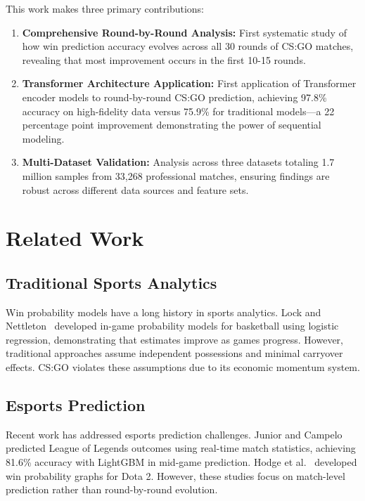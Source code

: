 \documentclass[10pt,twocolumn]{article}
\begin{document}
This work makes three primary contributions:

\begin{enumerate}
    \item \textbf{Comprehensive Round-by-Round Analysis:} First systematic study of how win prediction accuracy evolves across all 30 rounds of CS:GO matches, revealing that most improvement occurs in the first 10-15 rounds.

    \item \textbf{Transformer Architecture Application:} First application of Transformer encoder models to round-by-round CS:GO prediction, achieving 97.8\% accuracy on high-fidelity data versus 75.9\% for traditional models---a 22 percentage point improvement demonstrating the power of sequential modeling.

    \item \textbf{Multi-Dataset Validation:} Analysis across three datasets totaling 1.7 million samples from 33,268 professional matches, ensuring findings are robust across different data sources and feature sets.
\end{enumerate}

\section{Related Work}

\subsection{Traditional Sports Analytics}
Win probability models have a long history in sports analytics. Lock and Nettleton~\cite{lock2014} developed in-game probability models for basketball using logistic regression, demonstrating that estimates improve as games progress. However, traditional approaches assume independent possessions and minimal carryover effects. CS:GO violates these assumptions due to its economic momentum system.

\subsection{Esports Prediction}
Recent work has addressed esports prediction challenges. Junior and Campelo~\cite{junior2023} predicted League of Legends outcomes using real-time match statistics, achieving 81.6\% accuracy with LightGBM in mid-game prediction. Hodge et al.~\cite{hodge2019} developed win probability graphs for Dota 2. However, these studies focus on match-level prediction rather than round-by-round evolution.
\end{document}

